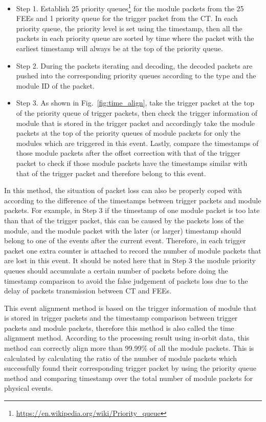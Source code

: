 \documentclass{raa}
\begin{document}
\begin{itemize}
\item Step 1. Establish 25 priority queues\footnote{\url{https://en.wikipedia.org/wiki/Priority_queue}} for the module packets from the 25 FEEs and 1 priority queue for the trigger packet from the CT. In each priority queue, the priority level is set using the timestamp, then all the packets in each priority queue are sorted by time where the packet with the earliest timestamp will always be at the top of the priority queue.
\item Step 2. During the packets iterating and decoding, the decoded packets are pushed into the corresponding priority queues according to the type and the module ID of the packet.
\item Step 3. As shown in Fig.~\ref{fig:time_align}, take the trigger packet at the top of the priority queue of trigger packets, then check the trigger information of module that is stored in the trigger packet and accordingly take the module packets at the top of the priority queues of module packets for only the modules which are triggered in this event. Lastly, compare the timestamps of those module packets after the offset correction with that of the trigger packet to check if those module packets have the timestamps similar with that of the trigger packet and therefore belong to this event.
\end{itemize}

In this method, the situation of packet loss can also be properly coped with according to the difference of the timestamps between trigger packets and module packets. For example, in Step 3 if the timestamp of one module packet is too late than that of the trigger packet, this can be caused by the packets loss of the module, and the module packet with the later (or larger) timestamp should belong to one of the events after the current event. Therefore, in each trigger packet one extra counter is attached to record the number of module packets that are lost in this event. It should be noted here that in Step 3 the module priority queues should accumulate a certain number of packets before doing the timestamp comparison to avoid the false judgement of packets loss due to the delay of packets transmission between CT and FEEs.

This event alignment method is based on the trigger information of module that is stored in trigger packets and the timestamp comparison between trigger packets and module packets, therefore this method is also called the time alignment method. According to the processing result using in-orbit data, this method can correctly align more than 99.99\% of all the module packets. This is calculated by calculating the ratio of the number of module packets which successfully found their corresponding trigger packet by using the priority queue method and comparing timestamp over the total number of module packets for physical events.
\end{document}
